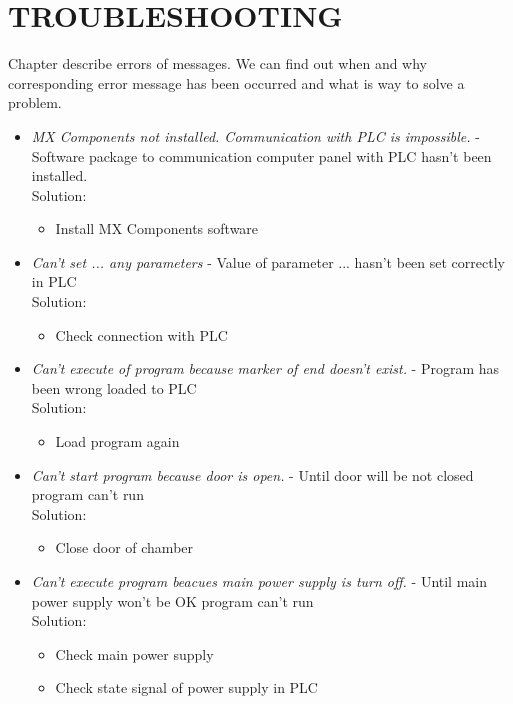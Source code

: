 \chapter {TROUBLESHOOTING}

Chapter describe errors of messages. We can find out when and why corresponding error message has been occurred and what is way to solve a problem.

\begin{itemize}

	\item \textit{MX Components not installed. Communication with PLC is impossible.} -  Software package to communication computer panel with PLC hasn't been installed. \\
 		Solution:
	\begin{itemize}
		\item Install MX Components software
	\end{itemize}

	\item \textit{Can't set ... any parameters} - Value of parameter ... hasn't been set correctly in PLC \\
 		Solution:
	\begin{itemize}
		\item Check connection with PLC
	\end{itemize}

	\item \textit{Can't execute of program because marker of end doesn't exist.} - Program has been wrong loaded to PLC \\
 		Solution:
		\begin{itemize}
			\item Load program again
		\end{itemize}

	\item \textit{Can't start program because door is open.} - Until door will be not closed program can't run \\
 		Solution:
		\begin{itemize}
			\item Close door of chamber
		\end{itemize}

	\item \textit{Can't execute program beacues main power supply is turn off.} - Until main power supply won't be OK program can't run \\
 		Solution: 
		\begin{itemize}
			\item Check main power supply
			\item Check state signal of power supply in PLC
		\end{itemize}


\end{itemize}
